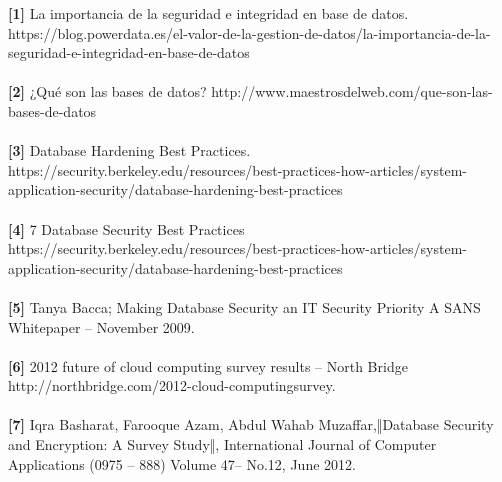 \begin{thebibliography}
\textbf{[1]} La importancia de la seguridad e integridad en base de datos. https://blog.powerdata.es/el-valor-de-la-gestion-de-datos/la-importancia-de-la-seguridad-e-integridad-en-base-de-datos\\\\

\textbf{[2]} ¿Qué son las bases de datos? http://www.maestrosdelweb.com/que-son-las-bases-de-datos\\\\

\textbf{[3]} Database Hardening Best Practices. https://security.berkeley.edu/resources/best-practices-how-articles/system-application-security/database-hardening-best-practices\\\\

\textbf{[4]} 7 Database Security Best Practices https://security.berkeley.edu/resources/best-practices-how-articles/system-application-security/database-hardening-best-practices\\\\

\textbf{[5]} Tanya Bacca; Making Database Security an IT Security
Priority A SANS Whitepaper – November 2009.\\\\

\textbf{[6]} 2012 future of cloud computing survey results – North
Bridge http://northbridge.com/2012-cloud-computingsurvey.\\\\

\textbf{[7]} Iqra Basharat, Farooque Azam, Abdul Wahab
Muzaffar,‖Database Security and Encryption: A Survey
Study‖, International Journal of Computer
Applications (0975 – 888) Volume 47– No.12,
June 2012.\\\\



\end{thebibliography}
